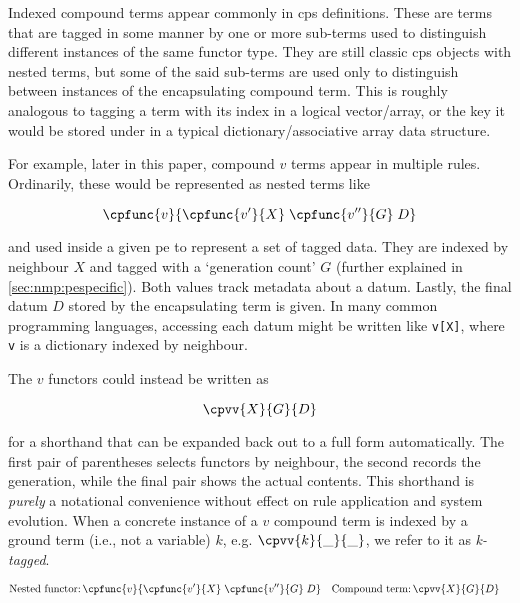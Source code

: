 Indexed compound terms appear commonly in \gls{cps} definitions.  These are terms that are tagged in some manner by one or more sub-terms used to distinguish different instances of the same functor type.  They are still classic \gls{cps} objects with nested terms, but some of the said sub-terms are used only to distinguish between instances of the encapsulating compound term.  This is roughly analogous to tagging a term with its index in a logical vector/array, or the key it would be stored under in a typical dictionary/associative array data structure.

For example, later in this paper, compound \(v\) terms appear in multiple rules.  Ordinarily, these would be represented as nested terms like 
\begin{framed}
\vspace{-1.0cm}
\[ \cpfunc{v}{\cpfunc{v'}{X} \; \cpfunc{v''}{G}\; D} \]
\vspace{-0.7cm}
\end{framed}\noindent
and used inside a given \gls{pe} to represent a set of tagged data.  They are indexed by neighbour \(X\) and tagged with a `generation count' \(G\) (further explained in \cref{sec:nmp:pespecific}).  Both values track metadata about a datum.  Lastly, the final datum \(D\) stored by the encapsulating term is given.  In many common programming languages, accessing each datum might be written like \texttt{v[X]}, where \texttt{v} is a dictionary indexed by neighbour.

The \(v\) functors could instead be written as
\begin{framed}
\vspace{-1.0cm}
\[ \cpvv{X}{G}{D} \]
\vspace{-0.7cm}
\end{framed}\noindent
for a shorthand that can be expanded back out to a full form automatically.  The first pair of parentheses selects functors by neighbour, the second records the generation, while the final pair shows the actual contents.  This shorthand is \emph{purely} a notational convenience without effect on rule application and system evolution.  When a concrete instance of a \(v\) compound term is indexed by a ground term (i.e., not a variable) \(k\), e.g. \(\cpvv{k}{\_}{\_}\), we refer to it as \emph{k-tagged}.

\begin{framed}
\vspace{-1.1cm}
    \begin{align*}
        \text{Nested functor:}&\, \cpfunc{v}{\cpfunc{v'}{X} \; \cpfunc{v''}{G}\; D} & \text{Compound term:}&\, \cpvv{X}{G}{D}
    \end{align*}
\vspace{-0.8cm}
\end{framed}

